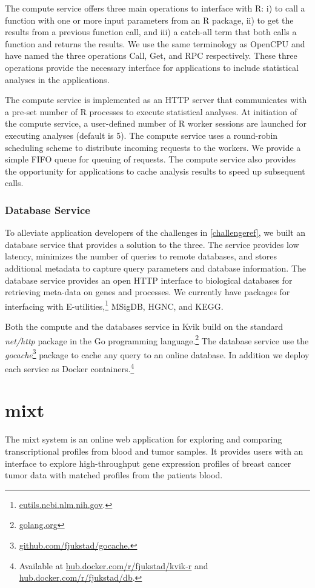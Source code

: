 The compute service offers three main operations to interface with R: i) to call
a function with one or more input parameters from an R package, ii) to get the
results from a previous function call, and iii) a catch-all term that both calls
a function and returns the results.  We use the same terminology as
OpenCPU\cite{opencpu} and have named the three operations Call, Get, and RPC
respectively. These three operations provide the necessary interface for
applications to include statistical analyses in the applications.

The compute service is implemented as an HTTP server that communicates with a
pre-set number of R processes to execute statistical analyses. 
At initiation of the compute service, a user-defined number of R worker sessions
are launched for executing analyses (default is 5).  
The compute service uses a round-robin scheduling scheme to distribute incoming
requests to the workers. We provide a simple FIFO queue for queuing of requests.
The compute service also provides the opportunity for applications to cache
analysis results to speed up subsequent calls. 

\subsubsection{Database Service} 
To alleviate application developers of the challenges in \ref{challengeref}, we
built an database service that provides a solution to the three. The service
provides low latency, minimizes the number of queries to remote databases, and
stores additional metadata to capture query parameters and database information.
The database service provides an open HTTP interface to biological databases for
retrieving meta-data on genes and processes.  We currently have packages for
interfacing with E-utilities,\footnote{\url{eutils.ncbi.nlm.nih.gov}.} MSigDB,
HGNC, and KEGG.

Both the compute and the databases service in Kvik build on the standard
\emph{net/http} package in the Go programming
language.\footnote{\url{golang.org}} The database service use
the \emph{gocache}\footnote{\url{github.com/fjukstad/gocache.}} package to cache
any query to an online database. In addition we deploy each service as Docker
containers.\footnote{Available at \url{hub.docker.com/r/fjukstad/kvik-r} and
\url{hub.docker.com/r/fjukstad/db}.}

\section{\gls{mixt}}
The \gls{mixt} system is an online web application for exploring and comparing
transcriptional profiles from blood and tumor samples. It provides users with an
interface to explore high-throughput gene expression profiles of breast cancer
tumor data with matched profiles from the patients blood. 

